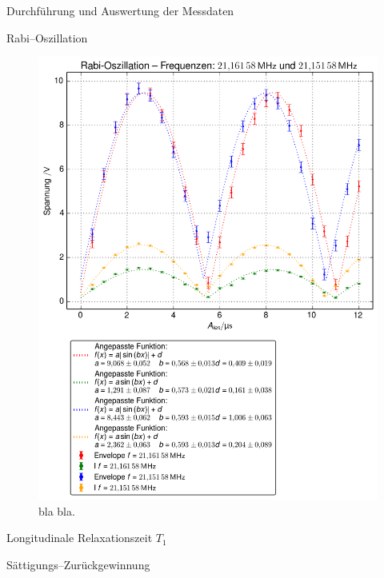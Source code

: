 \documentclass[pdftex, a4paper,11pt, twoside, ngerman]{report}
\begin{document}
\begin{chapter}{Durchführung und Auswertung der Messdaten}
\begin{section}{Rabi--Oszillation}
      \begin{figure}[htb]
        \centering
        \includegraphics[width=.9\textwidth]{Figures/Rabi_freq12.png}
        \caption{bla bla.}
        \label{figRabifreq12}
      \end{figure}
      
      
    \end{section}
    
    
    
    \begin{section}{
        Longitudinale Relaxationszeit $T_{1}$}
      \label{chpLongRelax}
      
      \begin{subsection}{Sättigungs--Zurückgewinnung}
        \label{chpLongRelaxSaettigung}
        

\end{subsection}
\end{section}
\end{chapter}
\end{document}
